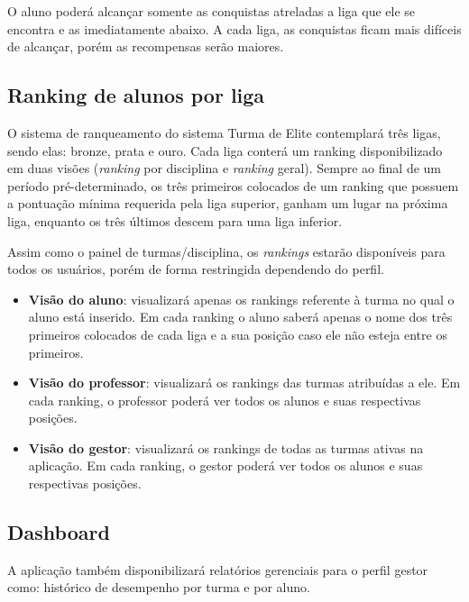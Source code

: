 \documentclass[
    12pt,               %
    openright,          %
    oneside,
    a4paper,            %
    paginasA3,  %
    english,            %
    brazil              %
    ]{ifsp-spo-inf-ctds} %
\begin{document}
O aluno poderá alcançar somente as conquistas atreladas a liga que ele se encontra e as imediatamente abaixo. A cada liga, as conquistas ficam mais difíceis de alcançar, porém as recompensas serão maiores. 
\subsection{Ranking de alunos por liga}
O sistema de ranqueamento do sistema Turma de Elite contemplará três ligas, sendo elas: bronze, prata e ouro. Cada liga conterá um ranking disponibilizado em duas visões (\textit{\gls{ranking}} por disciplina e \textit{\gls{ranking}} geral). Sempre ao final de um período pré-determinado, os três primeiros colocados de um ranking que possuem a pontuação mínima requerida pela liga superior, ganham um lugar na próxima liga, enquanto os três últimos descem para uma liga inferior.


Assim como o painel de turmas/disciplina, os \textit{\glspl{ranking}} estarão disponíveis para todos os usuários, porém de forma restringida dependendo do perfil.
\begin{itemize}
\item \textbf{Visão do aluno}: visualizará apenas os \glspl{ranking} referente à turma no qual o aluno está inserido. Em cada ranking o aluno saberá apenas o nome dos três primeiros colocados de cada liga e a sua posição caso ele não esteja entre os primeiros.
\item \textbf{Visão do professor}: visualizará os \glspl{ranking} das turmas atribuídas a ele. Em cada ranking, o professor poderá ver todos os alunos e suas respectivas posições.
\item \textbf{Visão do gestor}: visualizará os rankings de todas as turmas ativas na aplicação. Em cada \gls{ranking}, o gestor poderá ver todos os alunos e suas respectivas posições.
\end{itemize}

\subsection{Dashboard}
A aplicação também disponibilizará relatórios gerenciais para o perfil gestor como: histórico de desempenho por turma e por aluno.

\end{document}

